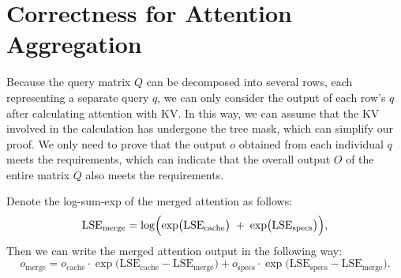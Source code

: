 \section{Correctness for Attention Aggregation}
\label{appendix:attn_aggr}

Because the query matrix $Q$ can be decomposed into several rows, each representing a separate query $q$, we can only consider the output of each row's $q$ after calculating attention with KV. In this way, we can assume that the KV involved in the calculation has undergone the tree mask, which can simplify our proof. We only need to prove that the output $o$ obtained from each individual $q$ meets the requirements, which can indicate that the overall output $O$ of the entire matrix $Q$ also meets the requirements.

\begin{proposition}
    Denote the log-sum-exp of the merged attention as follows:
    \begin{equation*}
        \mathrm{LSE}_{\mathrm{merge}} = \log\Bigl(\exp\bigl(\mathrm{LSE}_{\mathrm{cache}}\bigr) \;+\; \exp\bigl(\mathrm{LSE}_{\mathrm{specs}}\bigr)\Bigr),
    \end{equation*}
    Then we can write the merged attention output in the following way:
    \begin{equation*}
    o_{\mathrm{merge}} = o_{\mathrm{cache}} \cdot \exp\bigl(\mathrm{LSE}_{\mathrm{cache}} - \mathrm{LSE}_{\mathrm{merge}}\bigr) + o_{\mathrm{specs}} \cdot\exp\bigl(\mathrm{LSE}_{\mathrm{specs}} - \mathrm{LSE}_{\mathrm{merge}}\bigr).
    \end{equation*}
\end{proposition}


